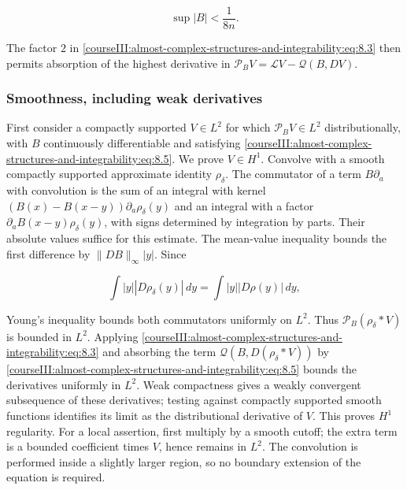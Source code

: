 \begin{equation}
\sup|B|<\frac1{8n}.
\label{courseIII:almost-complex-structures-and-integrability:eq:8.5}
\end{equation}

The factor \(2\) in \eqref{courseIII:almost-complex-structures-and-integrability:eq:8.3} then permits absorption of the highest derivative in
\(\mathcal P_BV=\mathcal LV-\mathcal Q(B,DV)\).

\subsubsection{Smoothness, including weak derivatives}
\label{courseIII:almost-complex-structures-and-integrability:section-8.1}

First consider a compactly supported \(V\in L^2\) for which \(\mathcal P_BV\in L^2\) distributionally, with \(B\) continuously differentiable and satisfying \eqref{courseIII:almost-complex-structures-and-integrability:eq:8.5}. We prove \(V\in H^1\). Convolve with a smooth compactly supported approximate identity \(\rho_\delta\). The commutator of a term \(B\partial_a\) with convolution is the sum of an integral with kernel
\((B(x)-B(x-y))\partial_a\rho_\delta(y)\)
and an integral with a factor \(\partial_aB(x-y)\rho_\delta(y)\), with signs determined by integration by parts. Their absolute values suffice for this estimate. The mean-value inequality bounds the first difference by \(\|DB\|_\infty|y|\). Since

\begin{equation}
\int|y||D\rho_\delta(y)|\,dy
=\int|y||D\rho(y)|\,dy,
\label{courseIII:almost-complex-structures-and-integrability:eq:8.6}
\end{equation}

Young's inequality bounds both commutators uniformly on \(L^2\). Thus \(\mathcal P_B(\rho_\delta*V)\) is bounded in \(L^2\). Applying \eqref{courseIII:almost-complex-structures-and-integrability:eq:8.3} and absorbing the term \(\mathcal Q(B,D(\rho_\delta*V))\) by \eqref{courseIII:almost-complex-structures-and-integrability:eq:8.5} bounds the derivatives uniformly in \(L^2\). Weak compactness gives a weakly convergent subsequence of these derivatives; testing against compactly supported smooth functions identifies its limit as the distributional derivative of \(V\). This proves \(H^1\) regularity. For a local assertion, first multiply by a smooth cutoff; the extra term is a bounded coefficient times \(V\), hence remains in \(L^2\). The convolution is performed inside a slightly larger region, so no boundary extension of the equation is required.

